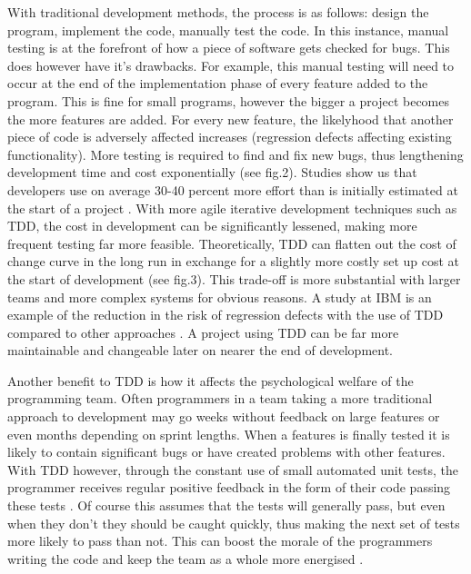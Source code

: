 \documentclass{scrartcl}
\begin{document}
With traditional development methods, the process is as follows: design the program, implement the code, manually test the code. In this instance, manual testing is at the forefront of how a piece of software gets checked for bugs. This does however have it's drawbacks. For example, this manual testing will need to occur at the end of the implementation phase of every feature added to the program. This is fine for small programs, however the bigger a project becomes the more features are added. For every new feature, the likelyhood that another piece of code is adversely affected increases (regression defects affecting existing functionality). More testing is required to find and fix new bugs, thus lengthening development time and cost exponentially \cite{boehm1981software} (see fig.2). Studies show us that developers use on average 30-40 percent more effort than is initially estimated at the start of a  project \cite{jorgensen2007systematic}. With more agile iterative development techniques such as TDD, the cost in development can be significantly lessened, making more frequent testing far more feasible. Theoretically, TDD can flatten out the cost of change curve in the long run in exchange for a slightly more costly set up cost at the start of development \cite{GDCBackwards} (see fig.3). This trade-off is more substantial with larger teams and more complex systems for obvious reasons. A study at IBM is an example of the reduction in the risk of regression defects with the use of TDD compared to other approaches \cite{williams2003test}. A project using TDD can be far more maintainable and changeable later on nearer the end of development. 



Another benefit to TDD is how it affects the psychological welfare of the programming team. Often programmers in a team taking a more traditional approach to development may go weeks without feedback on large features or even months depending on sprint lengths. When a features is finally tested it is  likely to contain significant bugs or have created problems with other features. With TDD however,  through the constant use of small automated unit tests, the programmer receives regular positive feedback in the form of their code passing these tests \cite{GamaEmbracingFun}. Of course this assumes that the tests will generally pass, but even when they don't they should be caught quickly, thus making the next set of tests more likely to pass than not. This can boost the morale of the programmers writing the code and keep the team as a whole more energised \cite{GDCBackwards}.
\end{document}

